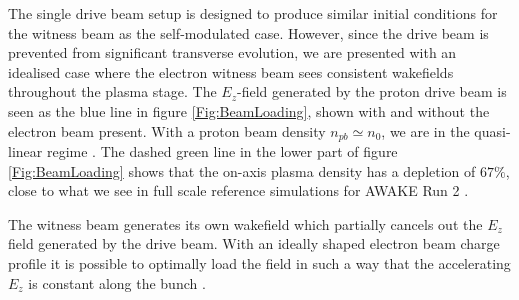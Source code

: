 \documentclass[aps,prstab,reprint,amsmath,amssymb,groupedaddress]{revtex4-1}
\begin{document}

The single drive beam setup is designed to produce similar initial conditions for the witness beam as the self-modulated
case. However, since the drive beam is prevented from significant transverse evolution, we are presented with an
idealised case where the electron witness beam sees consistent wakefields throughout the plasma stage. The $E_{z}$-field
generated by the proton drive beam is seen as the blue line in figure \ref{Fig:BeamLoading}, shown with and without the
electron beam present. With a proton beam density $n_{pb} \simeq n_{0}$, we are in the quasi-linear regime
\cite{rosenzweig:2010}. The dashed green line in the lower part of figure \ref{Fig:BeamLoading} shows that the on-axis
plasma density has a depletion of $67\%$, close to what we see in full scale reference simulations for AWAKE Run 2
\cite{awake_collaboration:2016}.



The witness beam generates its own wakefield which partially cancels out the $E_{z}$ field generated by the drive beam.
With an ideally shaped electron beam charge profile it is possible to optimally load the field in such a way that the
accelerating $E_{z}$ is constant along the bunch \cite{katsouleas:1987, tzoufras:2009}.

\end{document}
